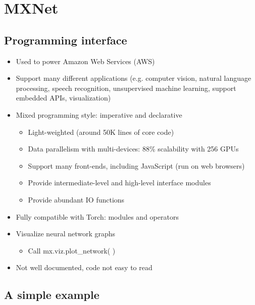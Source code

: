 \documentclass[11pt, oneside]{article}   	%
\begin{document}
\section{MXNet}\label{sec:MxNet}

\subsection{Programming interface}

\begin{itemize}
%
\item Used to power Amazon Web Services (AWS)
%
\item Support many different applications (e.g. computer vision, natural language processing,  speech recognition, unsupervised machine learning, support embedded APIs, visualization)
%
\item Mixed programming style: imperative and declarative
\begin{itemize}
\item Light-weighted (around 50K lines of core code)
\item Data parallelism with multi-devices: 88\% scalability with 256 GPUs
\item Support many front-ends, including JavaScript (run on web browsers)
\item Provide intermediate-level and high-level interface modules
\item Provide abundant IO functions 
%
\end{itemize}
%
\item Fully compatible with Torch: modules and operators
%
\item Visualize neural network graphs
\begin{itemize}
\item Call mx.viz.plot\_network( )
\end{itemize}
%
\item Not well documented, code not easy to read
%
\end{itemize}

\subsection{A simple example}
\end{document}
